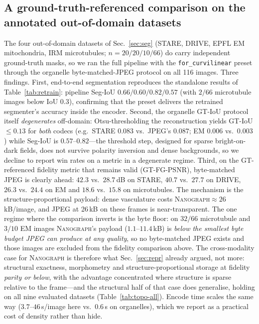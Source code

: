 \documentclass[10pt,a4paper]{article}
\newcommand{\method}{\textnormal{\textsc{Nanograph}}\xspace}
\begin{document}
\subsection{A ground-truth-referenced comparison on the annotated
out-of-domain datasets}
\label{sec:cross-gt}
The four out-of-domain datasets of Sec.~\ref{sec:seg} (STARE, DRIVE, EPFL EM
mitochondria, IRM microtubules; $n=20/20/10/66$) do carry independent
ground-truth masks, so we ran the full pipeline with the
\texttt{for\_curvilinear} preset through the organelle byte-matched-JPEG
protocol on all 116 images. Three findings. First, end-to-end segmentation
reproduces the standalone results of Table~\ref{tab:retrain}: pipeline
Seg-IoU $0.66/0.60/0.82/0.57$ (with $2/66$ microtubule images below IoU 0.3),
confirming that the preset delivers the retrained segmenter's accuracy inside
the encoder. Second, the organelle GT-IoU protocol itself \emph{degenerates}
off-domain: Otsu-thresholding the reconstruction yields GT-IoU $\le 0.13$ for
\emph{both} codecs (e.g.\ STARE $0.083$ vs.\ JPEG's $0.087$; EM $0.006$
vs.\ $0.003$) while Seg-IoU is $0.57$--$0.82$---the threshold step, designed
for sparse bright-on-dark fields, does not survive polarity inversion and
dense backgrounds, so we decline to report win rates on a metric in a
degenerate regime. Third, on the GT-referenced fidelity metric that remains
valid (GT-FG-PSNR), byte-matched JPEG is clearly ahead: $42.3$ vs.\ $28.7$\,dB
on STARE, $40.7$ vs.\ $27.7$ on DRIVE, $26.3$ vs.\ $24.4$ on EM and $18.6$
vs.\ $15.8$ on microtubules. The mechanism is the structure-proportional
payload: dense vasculature costs \method $\approx 26$\,kB/image, and JPEG at
26\,kB on these frames is near-transparent. The one regime where the
comparison inverts is the byte floor: on $32/66$ microtubule and $3/10$ EM
images \method's payload ($1.1$--$11.4$\,kB) is \emph{below the smallest
byte budget JPEG can produce at any quality}, so no byte-matched JPEG exists
and those images are excluded from the fidelity comparison above. The
cross-modality case for \method is therefore what Sec.~\ref{sec:repr}
already argued, not more: structural exactness, morphometry and
structure-proportional storage at fidelity \emph{parity or below}, with the
advantage concentrated where structure is sparse relative to the frame---and
the structural half of that case does generalise, holding on all nine
evaluated datasets (Table~\ref{tab:topo-all}).
Encode time scales the same way ($3.7$--$46$\,s/image here vs.\ $0.6$\,s on
organelles), which we report as a practical cost of density rather than hide.
\end{document}
